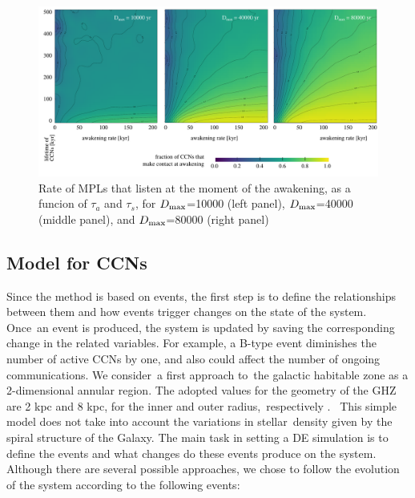 \documentclass[crop]{CSLB}
\newcommand{\cetis}{CCNs}
\begin{document}
\begin{figure} %
   \centering
   \includegraphics[width=\textwidth]{F_C_at_A.pdf}
   \caption{
Rate of MPLs that listen at the moment of the
awakening, as a funcion of $\tau_a$ and $\tau_s$, for
$D_{\rm max}$=10000 (left panel),
$D_{\rm max}$=40000 (middle panel), and
$D_{\rm max}$=80000 (right panel)
%
   }
   \label{F_C_at_A}
\end{figure}
        

                     

\subsection{Model for \cetis{}}

Since the method is based on events, the first step is to define the relationships between them and how events trigger changes on the state of the system.
%
Once an event is produced, the system is updated by saving the corresponding change in the related variables.
%
For example, a B-type event diminishes the number of active \cetis{} by one, and also could affect the number of ongoing communications.
%
We consider a first approach to the galactic habitable zone as a 2-dimensional annular region.
%
The adopted values for the geometry of the GHZ are 2 kpc and 8 kpc, for the inner and outer radius, respectively \citep{lineweaver_galactic_2004}. 
%
This simple model does not take into account the variations in stellar density given by the spiral structure of the Galaxy.
%
The main task in setting a DE simulation is to define the events and what changes do these events produce on the system.
%
Although there are several possible approaches, we chose to follow the evolution of the system according to the following events:
\end{document}
